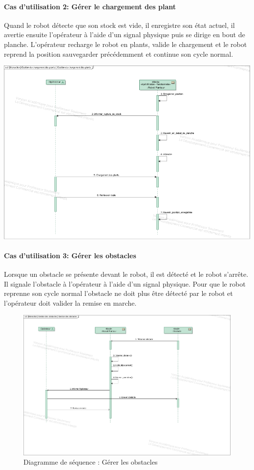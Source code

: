 \paragraph*{Cas d'utilisation 2: Gérer le chargement des plant}
Quand le robot détecte que son stock est vide, il enregistre son état actuel, il avertie ensuite l’opérateur à l'aide d'un signal physique puis se dirige en bout de planche. L’opérateur recharge le robot en plants, valide le chargement et le robot reprend la position sauvegarder précédemment et continue son cycle normal.%
\begin{center}
\includegraphics[width=.5\textwidth]{./I/images/gestionChargementPlant.pdf}
\label{fig:diaggestionChargement}
\end{center} 


\paragraph*{Cas d'utilisation 3: Gérer les obstacles}
Lorsque un obstacle se présente devant le robot, il est détecté et le robot s'arrête. Il signale l'obstacle à l’opérateur à l'aide d'un signal physique. Pour que le robot reprenne son cycle normal l'obstacle ne doit plus être détecté par le robot et l’opérateur doit valider la remise en marche. 

\begin{figure}[!ht]
\centering
\includegraphics[width=.6\textwidth]{./I/images/gererObstacles.pdf}
\caption{Diagramme de séquence : Gérer les obstacles}\label{fig:diagSeqGereObstacle}
\end{figure}